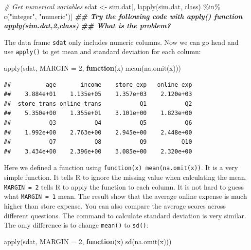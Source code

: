 \documentclass[
  12pt,
]{krantz}
\makeatletter
\newenvironment{Shaded}{\begin{snugshade}}{\end{snugshade}}
\newcommand{\AttributeTok}[1]{\textcolor[rgb]{0.61,0.61,0.61}{#1}}
\newcommand{\CommentTok}[1]{\textcolor[rgb]{0.37,0.37,0.37}{\textit{#1}}}
\newcommand{\ControlFlowTok}[1]{\textcolor[rgb]{0.27,0.27,0.27}{\textbf{#1}}}
\newcommand{\DecValTok}[1]{\textcolor[rgb]{0.06,0.06,0.06}{#1}}
\newcommand{\DocumentationTok}[1]{\textcolor[rgb]{0.37,0.37,0.37}{\textbf{\textit{#1}}}}
\newcommand{\FunctionTok}[1]{\textcolor[rgb]{0,0,0}{#1}}
\newcommand{\NormalTok}[1]{#1}
\newcommand{\OtherTok}[1]{\textcolor[rgb]{0.37,0.37,0.37}{#1}}
\newcommand{\SpecialCharTok}[1]{\textcolor[rgb]{0,0,0}{#1}}
\newcommand{\StringTok}[1]{\textcolor[rgb]{0.5,0.5,0.5}{#1}}
\newenvironment{kframe}{%
\medskip{}
\setlength{\fboxsep}{.8em}
 \def\at@end@of@kframe{}%
 \ifinner\ifhmode%
  \def\at@end@of@kframe{\end{minipage}}%
  \begin{minipage}{\columnwidth}%
 \fi\fi%
 \def\FrameCommand##1{\hskip\@totalleftmargin \hskip-\fboxsep
 \colorbox{shadecolor}{##1}\hskip-\fboxsep
     \hskip-\linewidth \hskip-\@totalleftmargin \hskip\columnwidth}%
 \MakeFramed {\advance\hsize-\width
   \@totalleftmargin\z@ \linewidth\hsize
   \@setminipage}}%
 {\par\unskip\endMakeFramed%
 \at@end@of@kframe}
\renewenvironment{Shaded}{\begin{kframe}}{\end{kframe}}
\makeatother
\begin{document}
\begin{Shaded}
\begin{Highlighting}[]
\CommentTok{\# Get numerical variables}
\NormalTok{sdat }\OtherTok{\textless{}{-}}\NormalTok{ sim.dat[, }\FunctionTok{lapply}\NormalTok{(sim.dat, class) }\SpecialCharTok{\%in\%} \FunctionTok{c}\NormalTok{(}\StringTok{"integer"}\NormalTok{, }\StringTok{"numeric"}\NormalTok{)]}
\DocumentationTok{\#\# Try the following code with apply() function apply(sim.dat,2,class)}
\DocumentationTok{\#\# What is the problem?}
\end{Highlighting}
\end{Shaded}

The data frame \texttt{sdat} only includes numeric columns. Now we can go head and use \texttt{apply()} to get mean and standard deviation for each column:

\begin{Shaded}
\begin{Highlighting}[]
\FunctionTok{apply}\NormalTok{(sdat, }\AttributeTok{MARGIN =} \DecValTok{2}\NormalTok{, }\ControlFlowTok{function}\NormalTok{(x) }\FunctionTok{mean}\NormalTok{(}\FunctionTok{na.omit}\NormalTok{(x)))}
\end{Highlighting}
\end{Shaded}

\begin{verbatim}
##          age       income    store_exp   online_exp 
##    3.884e+01    1.135e+05    1.357e+03    2.120e+03 
##  store_trans online_trans           Q1           Q2 
##    5.350e+00    1.355e+01    3.101e+00    1.823e+00 
##           Q3           Q4           Q5           Q6 
##    1.992e+00    2.763e+00    2.945e+00    2.448e+00 
##           Q7           Q8           Q9          Q10 
##    3.434e+00    2.396e+00    3.085e+00    2.320e+00
\end{verbatim}

Here we defined a function using \texttt{function(x)\ mean(na.omit(x))}. It is a very simple function. It tells R to ignore the missing value when calculating the mean. \texttt{MARGIN\ =\ 2} tells R to apply the function to each column. It is not hard to guess what \texttt{MARGIN\ =\ 1} mean. The result show that the average online expense is much higher than store expense. You can also compare the average scores across different questions. The command to calculate standard deviation is very similar. The only difference is to change \texttt{mean()} to \texttt{sd()}:

\begin{Shaded}
\begin{Highlighting}[]
\FunctionTok{apply}\NormalTok{(sdat, }\AttributeTok{MARGIN =} \DecValTok{2}\NormalTok{, }\ControlFlowTok{function}\NormalTok{(x) }\FunctionTok{sd}\NormalTok{(}\FunctionTok{na.omit}\NormalTok{(x)))}
\end{Highlighting}
\end{Shaded}
\end{document}
